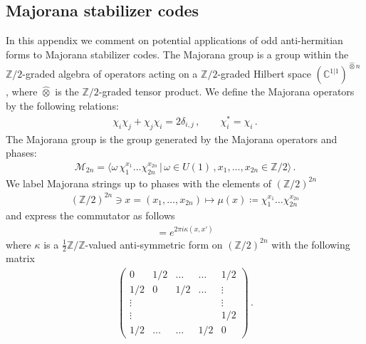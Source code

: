 \documentclass[sn-mathphys-num]{sn-jnl}
\theoremstyle{definition}
\numberwithin{equation}{section}
\theoremstyle{definition}
\def\CM {{\mathcal M}}
\def\IC{\mathbb{C}}
\def\IZ{{\mathbb{Z}}}
\def\la{\langle}
\def\ra{\rangle}
\begin{document}
\begin{appendices}
    \section{Majorana stabilizer codes}\label{app:majorana}
In this appendix we comment on potential applications of odd anti-hermitian forms to Majorana stabilizer codes. The Majorana group is a group within the $\IZ/2$-graded algebra of operators acting on a $\IZ/2$-graded Hilbert space  $(\IC^{1|1})^{\hat \otimes n}$ \cite{Bravyi_2002,bettaque2025structuremajoranacliffordgroup}, where $\hat \otimes$ is the $\IZ/2$-graded tensor product. We define the Majorana operators by the following relations:
\begin{align}
    \chi_i\chi_j+\chi_j\chi_i=2\delta_{i,j}\,,\quad\quad \chi^{*}_i=\chi_i\,.
\end{align} 
The Majorana group is the  group generated by the Majorana operators and phases: 
\begin{align}
    \CM_{2n}=\la \omega \,\chi_1^{x_1}\ldots \chi_{2n}^{x_{2n}}\,|\,\omega \in U(1)\,, x_1,\ldots, x_{2n}\in \IZ/2\ra\,.
\end{align}
We label Majorana strings up to phases with the elements of $(\IZ/2)^{2n}$
\begin{align}
(\IZ/2)^{2n}\ni x=(x_1,\ldots, x_{2n})\mapsto \mu(x)\coloneqq \chi_1^{x_1}\ldots \chi_{2n}^{x_{2n}}
\end{align}
and express the commutator as follows
\begin{align}
    [\omega_1 \mu(x),\omega_2\mu(x')]=e^{2\pi i \kappa(x,x')}
\end{align}
where $\kappa$ is a $\frac{1}{2}\IZ/\IZ$-valued anti-symmetric form on $(\IZ/2)^{2n}$ with the following matrix  
    \begin{align}\label{Maj_commutator}
         \begin{pmatrix}
            0 & 1/2 & \ldots & \ldots &  1/2\\
            1/2& 0 & 1/2 & \ldots & \vdots \\
            \vdots&  & & & \vdots\\
            \vdots&  & & & 1/2\\
            1/2 &\ldots & \ldots & 1/2 & 0
        \end{pmatrix}\,.
    \end{align}


\end{appendices}
\end{document}
